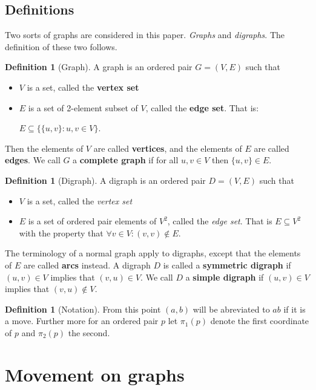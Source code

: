 \documentclass[a4paper,11pt]{article}
\theoremstyle{plain}
\theoremstyle{definition}
\newtheorem{definition}[theorem]{Definition}
\begin{document}
\subsection{Definitions}
Two sorts of graphs are considered in this paper. \textit{Graphs} and
\textit{digraphs}. The definition of these two follows.
\begin{definition}[Graph]\label{def graph}
	A graph is an ordered pair $G = (V,E)$ such that
	\begin{itemize}
		\item $V$ is a set, called the \textbf{vertex set}
		\item $E$ is a set of 2-element subset of $V$, called
		the \textbf{edge set}. That is:
			
			$E \subseteq \{\{u,v\}:u,v \in V\}$.
	\end{itemize}
	Then the elements of $V$ are called \textbf{vertices}, and
	the elements of $E$ are called \textbf{edges}. We call $G$
	a \textbf{complete graph} if for all $u,v\in V$ then $\{u,v\}
	\in E$.
\end{definition}
\begin{definition}[Digraph]\label{def digraph}
	A digraph is an ordered pair $D = (V,E)$ such that
	\begin{itemize}
		\item $V$ is a set, called the \textit{vertex set}
		\item $E$ is a set of ordered pair elements of $V^2$, 
			called the \textit{edge set}. That is $E 
			\subseteq V^2$ with the property that $\forall v 
			\in V: (v,v) \notin E$.
	\end{itemize}
	The terminology of a normal graph apply to digraphs, except
	that the elements of $E$ are called \textbf{arcs} instead. A
	digraph $D$ is called a \textbf{symmetric digraph} if $(u,v)
	\in V$ implies that $(v,u) \in V$. We call $D$ a \textbf{simple
	digraph} if $(u,v)\in V$ implies that $(v,u) \notin V$.
\end{definition}
\begin{definition}[Notation]\label{def notation}
	From this point $(a,b)$ will be abreviated to $ab$ if it is
	a move. Further more for an ordered pair $p$ let $\pi_1(p)$
	denote the first coordinate of $p$ and $\pi_2(p)$ the second.
\end{definition}
\section{Movement on graphs}
\end{document}
